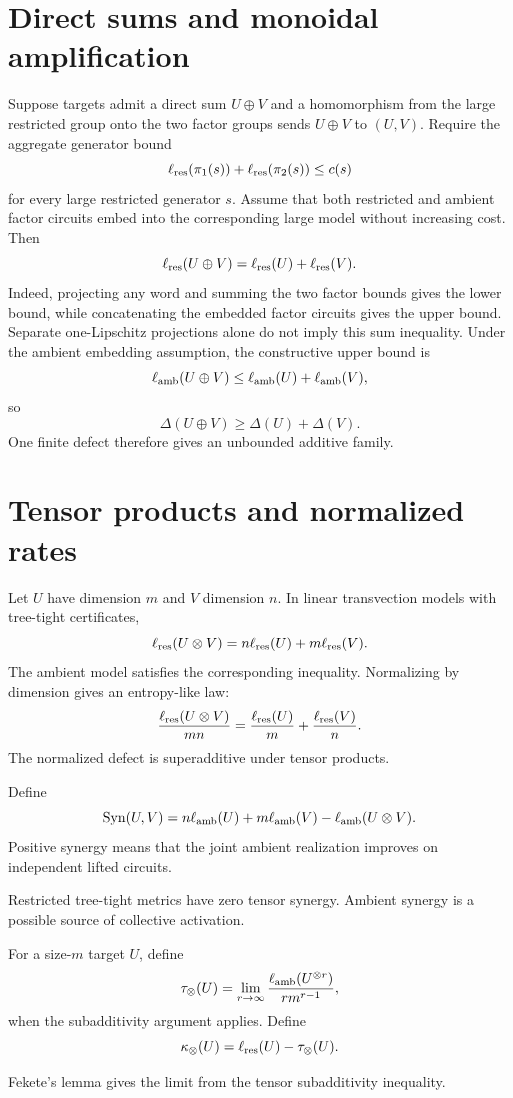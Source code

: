 \section{Direct sums and monoidal amplification}
Suppose targets admit a direct sum $U\oplus V$ and a homomorphism from the large restricted group onto the two factor groups sends $U\oplus V$ to $(U,V)$.  Require the aggregate generator bound
\[
\ell_{\mathrm{res}}(\pi_1(s))+\ell_{\mathrm{res}}(\pi_2(s))\le c(s)
\]
for every large restricted generator $s$.  Assume that both restricted and ambient factor circuits embed into the corresponding large model without increasing cost.  Then
\[
\ell_{\mathrm{res}}(U\oplus V)
=
\ell_{\mathrm{res}}(U)+\ell_{\mathrm{res}}(V).
\]
Indeed, projecting any word and summing the two factor bounds gives the lower bound, while concatenating the embedded factor circuits gives the upper bound.  Separate one-Lipschitz projections alone do not imply this sum inequality.
Under the ambient embedding assumption, the constructive upper bound is
\[
\ell_{\mathrm{amb}}(U\oplus V)
\le
\ell_{\mathrm{amb}}(U)+\ell_{\mathrm{amb}}(V),
\]
so
\[
\Delta(U\oplus V)
\ge
\Delta(U)+\Delta(V).
\]
One finite defect therefore gives an unbounded additive family.

\section{Tensor products and normalized rates}
Let $U$ have dimension $m$ and $V$ dimension $n$.  In linear transvection models with tree-tight certificates,
\[
\ell_{\mathrm{res}}(U\otimes V)
=
n\ell_{\mathrm{res}}(U)+m\ell_{\mathrm{res}}(V).
\]
The ambient model satisfies the corresponding inequality.  Normalizing by dimension gives an entropy-like law:
\[
\frac{\ell_{\mathrm{res}}(U\otimes V)}{mn}
=
\frac{\ell_{\mathrm{res}}(U)}m+
\frac{\ell_{\mathrm{res}}(V)}n.
\]
The normalized defect is superadditive under tensor products.

\begin{definition}
Define
\[
\operatorname{Syn}(U,V)
=
n\ell_{\mathrm{amb}}(U)+m\ell_{\mathrm{amb}}(V)-\ell_{\mathrm{amb}}(U\otimes V).
\]
Positive synergy means that the joint ambient realization improves on independent lifted circuits.
\end{definition}
Restricted tree-tight metrics have zero tensor synergy.  Ambient synergy is a possible source of collective activation.

\begin{definition}
For a size-$m$ target $U$, define
\[
\tau_\otimes(U)
=
\lim_{r\to\infty}
\frac{\ell_{\mathrm{amb}}(U^{\otimes r})}{r m^{r-1}},
\]
when the subadditivity argument applies.  Define
\[
\kappa_\otimes(U)
=
\ell_{\mathrm{res}}(U)-\tau_\otimes(U).
\]
\end{definition}
Fekete's lemma gives the limit from the tensor subadditivity inequality.

